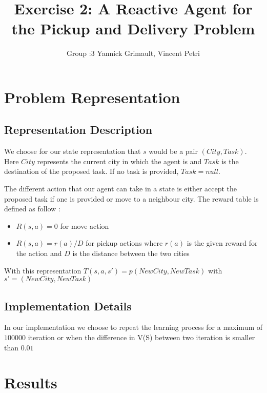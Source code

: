 \documentclass[11pt]{article}
\title{\bf Exercise 2: A Reactive Agent for the Pickup and Delivery Problem}
\author{Group \textnumero:3 Yannick Grimault, Vincent Petri}
\begin{document}
\maketitle

\section{Problem Representation}

\subsection{Representation Description}

We choose for our state representation that $s$ would be a pair $(City,Task)$. Here $City$ represents the current city in which the agent is and $Task$ is the destination of the proposed task. If no task is provided, $Task = null$.

The different action that our agent can take in a state is either accept the proposed task if one is provided or move to a neighbour city. The reward table is defined as follow :
\begin{itemize}
\item $R(s,a)=0$ for move action
\item $R(s,a)=r(a)/D $ for pickup actions where $r(a)$ is the given reward for the action and $D$ is the distance between the two cities 
\end{itemize}

With this representation $T(s,a,s')=p(NewCity,NewTask)$ with $s'=(NewCity,NewTask)$

\subsection{Implementation Details}
In our implementation we choose to repeat the learning process for a maximum of $100000$ iteration or when the difference in V(S) between two iteration is smaller than $0.01$

\section{Results}
\end{document}
